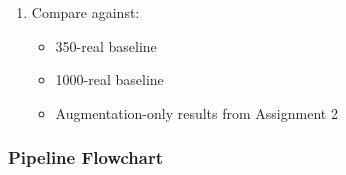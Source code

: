 \begin{enumerate}
    \item Compare against:
    
    \begin{itemize}
        \item 350-real baseline
        \item 1000-real baseline
        \item Augmentation-only results from Assignment 2
    \end{itemize}

\end{enumerate}

\subsubsection{Pipeline Flowchart}


